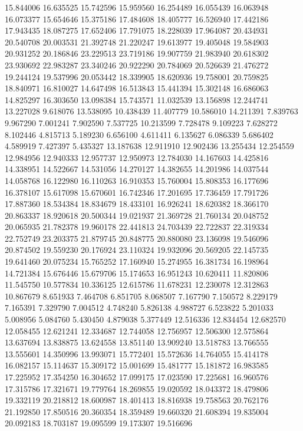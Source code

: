 15.844006
16.635525
15.742596
15.959560
16.254489
16.055439
16.063948
16.073377
15.654646
15.375186
17.484608
18.405777
16.526940
17.442186
17.943435
18.087275
17.652406
17.791075
18.228039
17.964087
20.434931
20.540708
20.003531
21.392748
21.220247
19.613977
19.405048
19.584903
20.931252
20.186846
23.229513
23.719186
19.907759
21.983940
20.618302
23.930692
22.983287
23.340246
20.922290
20.784069
20.526639
21.476272
19.244124
19.537996
20.053442
18.339905
18.620936
19.758001
20.759825
18.840971
16.810027
14.647498
16.513843
15.441394
15.302148
16.686063
14.825297
16.303650
13.098384
15.743571
11.032539
13.156898
12.244741
13.227028
9.618076
13.538095
10.438439
11.407779
10.586010
14.211391
7.839763
9.967290
7.001241
7.902590
7.537725
10.213599
7.728478
9.109223
7.628272
8.102446
4.815713
5.189230
6.656100
4.611411
6.135627
6.086339
5.686402
4.589919
7.427397
5.435327
13.187638
12.911910
12.902436
13.255434
12.254559
12.984956
12.940333
12.957737
12.950973
12.784030
14.167603
14.425816
14.338951
14.522667
14.531056
14.270127
14.382655
14.201986
14.037544
14.058768
16.122980
16.110263
16.910353
15.760004
15.808353
16.177696
16.378107
15.617098
15.670601
16.742346
17.201695
17.736459
17.791726
17.887360
18.534384
18.834679
18.433101
16.926241
18.620382
18.366170
20.863337
18.920618
20.500344
19.021937
21.369728
21.760134
20.048752
20.065935
21.782378
19.960178
22.441813
24.703439
22.722837
22.319334
22.752749
23.203375
21.879745
20.848775
20.880080
23.136098
19.546096
20.874502
19.559230
20.176924
23.110324
19.932096
20.569205
22.145735
19.641460
20.075234
15.765252
17.160940
15.274955
16.381734
16.198964
14.721384
15.676446
15.679706
15.174653
16.951243
10.620411
11.820806
11.545750
10.577834
10.336125
12.615786
11.678231
12.230078
12.312863
10.867679
8.651933
7.464708
6.851705
8.068507
7.167790
7.150572
8.229179
7.165391
7.329790
7.004512
4.748240
5.826138
4.988727
6.523822
5.201033
5.008956
5.084760
5.430450
4.879038
5.377449
12.516336
12.834454
12.682570
12.058455
12.621241
12.334687
12.744058
12.756957
12.506300
12.575864
13.637694
13.838875
13.624558
13.851140
13.909240
13.518783
13.766555
13.555601
14.350996
13.993071
15.772401
15.572636
14.764055
15.414178
16.082157
15.114637
15.309172
15.001699
15.481777
15.181872
16.983585
17.225952
17.354250
16.304652
17.099175
17.023590
17.225681
16.960576
17.315786
17.321671
19.779764
18.269855
19.020592
18.043372
18.479806
19.332119
20.218812
18.600987
18.401413
18.816938
19.758563
20.762176
21.192850
17.850516
20.360354
18.359489
19.660320
21.608394
19.835004
20.092183
18.703187
19.095599
19.173307
19.516696
